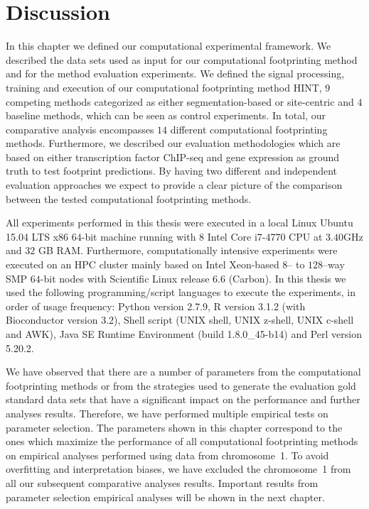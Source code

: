 \section{Discussion}
\label{sec:discussion.4}

In this chapter we defined our computational experimental framework. We described the data sets used as input for our computational footprinting method and for the method evaluation experiments. We defined the signal processing, training and execution of our computational footprinting method HINT, $9$ competing methods categorized as either segmentation-based or site-centric and $4$ baseline methods, which can be seen as control experiments. In total, our comparative analysis encompasses $14$ different computational footprinting methods. Furthermore, we described our evaluation methodologies which are based on either transcription factor ChIP-seq and gene expression as ground truth to test footprint predictions. By having two different and independent evaluation approaches we expect to provide a clear picture of the comparison between the tested computational footprinting methods.

All experiments performed in this thesis were executed in a local Linux Ubuntu 15.04 LTS x86 $64$-bit machine running with $8$ Intel Core i7-4770 CPU at $3.40$GHz and $32$ GB RAM. Furthermore, computationally intensive experiments were executed on an HPC cluster mainly based on Intel Xeon-based $8$-- to $128$--way SMP $64$-bit nodes with Scientific Linux release 6.6 (Carbon). In this thesis we used the following programming/script languages to execute the experiments, in order of usage frequency: Python version 2.7.9, R version 3.1.2 (with Bioconductor version 3.2), Shell script (UNIX shell, UNIX z-shell, UNIX c-shell and AWK), Java SE Runtime Environment (build 1.8.0\_45-b14) and Perl version 5.20.2.

We have observed that there are a number of parameters from the computational footprinting methods or from the strategies used to generate the evaluation gold standard data sets that have a significant impact on the performance and further analyses results. Therefore, we have performed multiple empirical tests on parameter selection. The parameters shown in this chapter correspond to the ones which maximize the performance of all computational footprinting methods on empirical analyses performed using data from chromosome~1. To avoid overfitting and interpretation biases, we have excluded the chromosome~1 from all our subsequent comparative analyses results. Important results from parameter selection empirical analyses will be shown in the next chapter.

